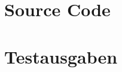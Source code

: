 \documentclass[12pt,a4paper]{article}
\begin{document}
\section {Source Code}
%
%
%
%
%
%
%
%
%
%
%
%
%
%
%
%
%
%
%
%
%
%
%
%
%
%
%
%
%
%
%
%
%
%
%
%

\section {Testausgaben} 
\end{document}
